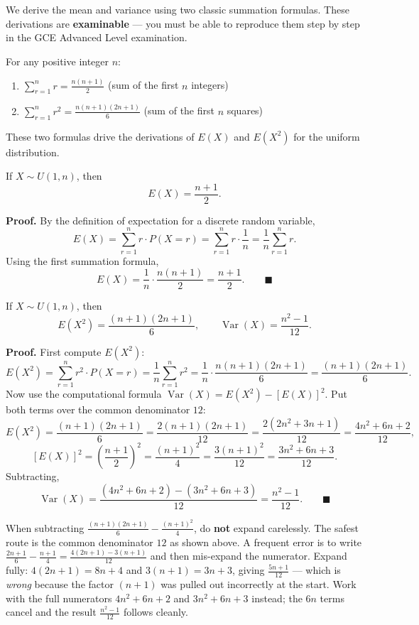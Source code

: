 \documentclass[11pt]{article}
\begin{document}
We derive the mean and variance using two classic summation formulas. These derivations are \textbf{examinable} — you must be able to reproduce them step by step in the GCE Advanced Level examination.

\begin{methode}
For any positive integer $n$:
\begin{enumerate}
\item $\displaystyle\sum_{r=1}^{n} r = \frac{n(n+1)}{2}$ \quad (sum of the first $n$ integers)
\item $\displaystyle\sum_{r=1}^{n} r^2 = \frac{n(n+1)(2n+1)}{6}$ \quad (sum of the first $n$ squares)
\end{enumerate}
These two formulas drive the derivations of $E(X)$ and $E(X^2)$ for the uniform distribution.
\end{methode}

\begin{propriete}
If $X\sim U(1,n)$, then
\[
E(X)=\frac{n+1}{2}.
\]
\end{propriete}

\textbf{Proof.} By the definition of expectation for a discrete random variable,
\[
E(X)=\sum_{r=1}^{n} r\cdot P(X=r)=\sum_{r=1}^{n} r\cdot\frac{1}{n}=\frac{1}{n}\sum_{r=1}^{n} r.
\]
Using the first summation formula,
\[
E(X)=\frac{1}{n}\cdot\frac{n(n+1)}{2}=\frac{n+1}{2}. \qquad\blacksquare
\]

\begin{propriete}
If $X\sim U(1,n)$, then
\[
E(X^2)=\frac{(n+1)(2n+1)}{6},\qquad
\operatorname{Var}(X)=\frac{n^2-1}{12}.
\]
\end{propriete}

\textbf{Proof.} First compute $E(X^2)$:
\[
E(X^2)=\sum_{r=1}^{n} r^2\cdot P(X=r)=\frac{1}{n}\sum_{r=1}^{n} r^2
=\frac{1}{n}\cdot\frac{n(n+1)(2n+1)}{6}=\frac{(n+1)(2n+1)}{6}.
\]
Now use the computational formula $\operatorname{Var}(X)=E(X^2)-[E(X)]^2$. Put both terms over the common denominator $12$:
\[
E(X^2)=\frac{(n+1)(2n+1)}{6}=\frac{2(n+1)(2n+1)}{12}=\frac{2(2n^2+3n+1)}{12}=\frac{4n^2+6n+2}{12},
\]
\[
[E(X)]^2=\left(\frac{n+1}{2}\right)^2=\frac{(n+1)^2}{4}=\frac{3(n+1)^2}{12}=\frac{3n^2+6n+3}{12}.
\]
Subtracting,
\[
\operatorname{Var}(X)=\frac{(4n^2+6n+2)-(3n^2+6n+3)}{12}=\frac{n^2-1}{12}. \qquad\blacksquare
\]

\begin{attention}
When subtracting $\frac{(n+1)(2n+1)}{6}-\frac{(n+1)^2}{4}$, do \textbf{not} expand carelessly. The safest route is the common denominator $12$ as shown above. A frequent error is to write $\frac{2n+1}{6}-\frac{n+1}{4}=\frac{4(2n+1)-3(n+1)}{12}$ and then mis-expand the numerator. Expand fully: $4(2n+1)=8n+4$ and $3(n+1)=3n+3$, giving $\frac{5n+1}{12}$ — which is \emph{wrong} because the factor $(n+1)$ was pulled out incorrectly at the start. Work with the full numerators $4n^2+6n+2$ and $3n^2+6n+3$ instead; the $6n$ terms cancel and the result $\frac{n^2-1}{12}$ follows cleanly.
\end{attention}
\end{document}

